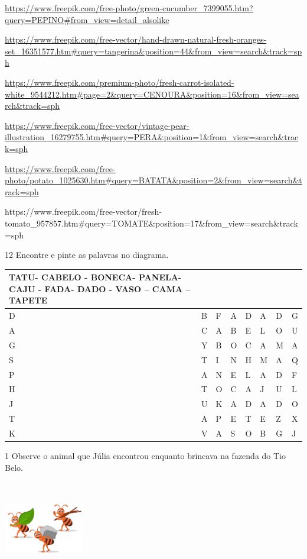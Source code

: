 {\url{https://www.freepik.com/free-photo/green-cucumber_7399055.htm?query=PEPINO\#from_view=detail_alsolike}

\url{https://www.freepik.com/free-vector/hand-drawn-natural-fresh-oranges-set_16351577.htm\#query=tangerina\&position=44\&from_view=search\&track=sph}

\url{https://www.freepik.com/premium-photo/fresh-carrot-isolated-white_9544212.htm\#page=2\&query=CENOURA\&position=16\&from_view=search\&track=sph}

\url{https://www.freepik.com/free-vector/vintage-pear-illustration_16279755.htm\#query=PERA\&position=1\&from_view=search\&track=sph}

\url{https://www.freepik.com/free-photo/potato_1025630.htm\#query=BATATA\&position=2\&from_view=search\&track=sph}

https://www.freepik.com/free-vector/fresh-tomato\_957857.htm\#query=TOMATE\&position=17\&from\_view=search\&track=sph

\num{12} Encontre e pinte as palavras no diagrama.


\begin{longtable}[]{@{}llllllll@{}}
\toprule
TATU- CABELO - BONECA- PANELA- CAJU - FADA- DADO - VASO -- CAMA --
TAPETE\tabularnewline
\midrule
\endhead
D & B & F & A & D & A & D & G\tabularnewline
A & C & A & B & E & L & O & U\tabularnewline
G & Y & B & O & C & A & M & A\tabularnewline
S & T & I & N & H & M & A & Q\tabularnewline
P & A & N & E & L & A & D & F\tabularnewline
H & T & O & C & A & J & U & L\tabularnewline
J & U & K & A & D & A & D & O\tabularnewline
T & A & P & E & T & E & Z & X\tabularnewline
K & V & A & S & O & B & G & J\tabularnewline
\bottomrule
\end{longtable}

\protect\hypertarget{_Hlk128550489}{}{}


\num{1} Observe o animal que Júlia encontrou enquanto brincava na 
fazenda do Tio Belo.

\includegraphics[width=1.36528in,height=1.64861in]{media/image42.jpeg}

}
